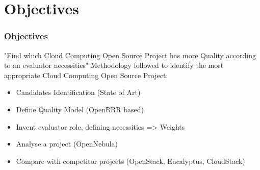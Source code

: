 \section{Objectives}

\begin{frame}[allowframebreaks]
\frametitle{Objectives}

"Find which Cloud Computing Open Source Project has more
Quality according to an evaluator necessities" \linebreak
Methodology followed to identify the most
appropriate Cloud Computing Open Source Project:
\begin{itemize}
	\item Candidates Identification (State of Art)
	\item Define Quality Model (OpenBRR based)
	\item Invent evaluator role, defining necessities => Weights
	\item Analyse a project (OpenNebula)
        \item Compare with competitor projects (OpenStack,
        Eucalyptus, CloudStack)
\end{itemize}

\end{frame}
